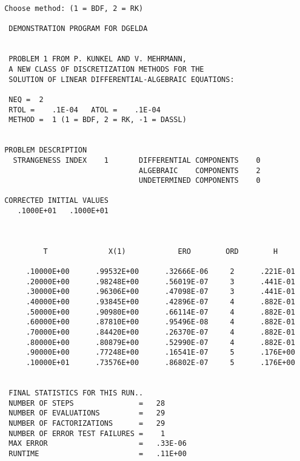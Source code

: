 \begin{verbatim}
 Choose method: (1 = BDF, 2 = RK)

  DEMONSTRATION PROGRAM FOR DGELDA


  PROBLEM 1 FROM P. KUNKEL AND V. MEHRMANN,
  A NEW CLASS OF DISCRETIZATION METHODS FOR THE
  SOLUTION OF LINEAR DIFFERENTIAL-ALGEBRAIC EQUATIONS:

  NEQ =  2
  RTOL =    .1E-04   ATOL =    .1E-04
  METHOD =  1 (1 = BDF, 2 = RK, -1 = DASSL)


 PROBLEM DESCRIPTION
   STRANGENESS INDEX    1       DIFFERENTIAL COMPONENTS    0
                                ALGEBRAIC    COMPONENTS    2
                                UNDETERMINED COMPONENTS    0

 CORRECTED INITIAL VALUES
    .1000E+01   .1000E+01



          T              X(1)            ERO        ORD        H

      .10000E+00      .99532E+00      .32666E-06     2      .221E-01
      .20000E+00      .98248E+00      .56019E-07     3      .441E-01
      .30000E+00      .96306E+00      .47098E-07     3      .441E-01
      .40000E+00      .93845E+00      .42896E-07     4      .882E-01
      .50000E+00      .90980E+00      .66114E-07     4      .882E-01
      .60000E+00      .87810E+00      .95496E-08     4      .882E-01
      .70000E+00      .84420E+00      .26370E-07     4      .882E-01
      .80000E+00      .80879E+00      .52990E-07     4      .882E-01
      .90000E+00      .77248E+00      .16541E-07     5      .176E+00
      .10000E+01      .73576E+00      .86802E-07     5      .176E+00


  FINAL STATISTICS FOR THIS RUN..
  NUMBER OF STEPS               =   28
  NUMBER OF EVALUATIONS         =   29
  NUMBER OF FACTORIZATIONS      =   29
  NUMBER OF ERROR TEST FAILURES =    1
  MAX ERROR                     =   .33E-06
  RUNTIME                       =   .11E+00
\end{verbatim}







